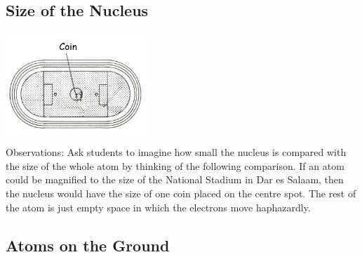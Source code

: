 \begin{multicols}{2}
\subsection{Size of the Nucleus} 

\begin{center}
\includegraphics[width=0.4\textwidth]{./img/source/size-nucleus.jpg}
\end{center}

\begin{description*}
\item[Observations:]{Ask students to imagine how small the
nucleus is compared with the size of the whole
atom by thinking of the following comparison.
If an atom could be magnified to the size of the
National Stadium in Dar es Salaam, then the
nucleus would have the size of one coin
placed on the centre spot. The rest of the atom is
just empty space in which the electrons move
haphazardly.}
\end{description*}

\columnbreak

\subsection{Atoms on the Ground}


\end{multicols}
